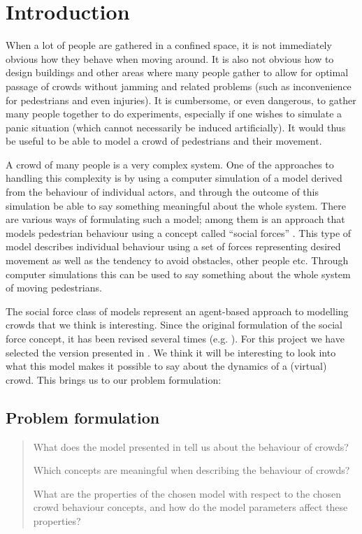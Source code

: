 \section{Introduction}
When a lot of people are gathered in a confined space, it is not immediately 
obvious how they behave when moving around. It is also not obvious how to 
design buildings and other areas where many people gather to allow for optimal 
passage of crowds without jamming and related problems (such as inconvenience 
for pedestrians and even injuries). It is cumbersome, or even dangerous, to 
gather many people together to do experiments, especially if one wishes to 
simulate a panic situation (which cannot necessarily be induced artificially).  
It would thus be useful to be able to model a crowd of pedestrians and their 
movement.

A crowd of many people is a very complex system. One of the approaches to 
handling this complexity is by using a computer simulation of a model derived 
from the behaviour of individual actors, and through the outcome of this 
simulation be able to say something meaningful about the whole system. There 
are various ways of formulating such a model; among them is an approach that 
models pedestrian behaviour using a concept called ``social forces'' 
\cite{social-force}. This type of model describes individual behaviour using a 
set of forces representing desired movement as well as the tendency to avoid 
obstacles, other people etc. Through computer simulations this can be used to 
say something about the whole system of moving pedestrians.

The social force class of models represent an agent-based approach to 
modelling crowds that we think is interesting. Since the original formulation 
of the social force concept, it has been revised several times (e.g.  
\cite{helbing00}). For this project we have selected the version presented in 
\cite{self-org}.  We think it will be interesting to look into what this model 
makes it possible to say about the dynamics of a (virtual) crowd. This brings 
us to our problem formulation:

\subsection{Problem formulation}
\begin{quote}
    What does the model presented in \cite{self-org} tell us about the 
    behaviour of crowds?

    Which concepts are meaningful when describing the behaviour of crowds?

    What are the properties of the chosen model with respect to the chosen 
    crowd behaviour concepts, and how do the model parameters affect these 
    properties?
\end{quote}

